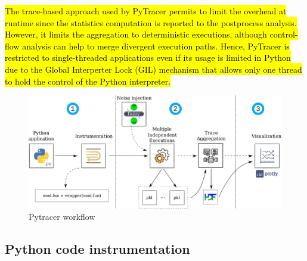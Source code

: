 \documentclass[10pt,journal,compsoc]{IEEEtran}
\DeclareRobustCommand{\add}[1]{\sethlcolor{lightgreen}\hl{#1}}
\DeclareRobustCommand{\add}[1]{#1}
\begin{document}
\add{
    The trace-based approach used by PyTracer permits to limit the 
    overhead at runtime since the statistics computation is reported to the postprocess analysis.
    However, it limits the aggregation to deterministic executions,
    although control-flow analysis can help to merge divergent execution paths.
    Hence, PyTracer is restricted to single-threaded applications even if its usage
    is limited in Python due to the Global Interperter Lock (GIL) mechanism
    that allows only one thread to hold the control of the Python interpreter.
}



\begin{figure}
    \centering
    \includegraphics[width=0.75\linewidth]{figure/workflow.pdf}
    \caption{Pytracer workflow
    }
    \label{fig:workflow}
\end{figure}

\subsection{Python code instrumentation}

\end{document}
